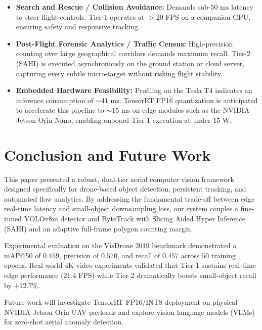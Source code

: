 \documentclass[conference]{IEEEtran}
\begin{document}
\begin{itemize}
    \item \textbf{Search and Rescue / Collision Avoidance:} Demands sub-$50\text{ ms}$ latency to steer flight controls. Tier-1 operates at $>20$ FPS on a companion GPU, ensuring safety and responsive tracking.
    \item \textbf{Post-Flight Forensic Analytics / Traffic Census:} High-precision counting over large geographical corridors demands maximum recall. Tier-2 (SAHI) is executed asynchronously on the ground station or cloud server, capturing every subtle micro-target without risking flight stability.
    \item \textbf{Embedded Hardware Feasibility:} Profiling on the Tesla T4 indicates an inference consumption of $\sim 41\text{ ms}$. TensorRT FP16 quantization is anticipated to accelerate this pipeline to $\sim 15\text{ ms}$ on edge modules such as the NVIDIA Jetson Orin Nano, enabling onboard Tier-1 execution at under $15\text{ W}$.
\end{itemize}

\section{Conclusion and Future Work}
This paper presented a robust, dual-tier aerial computer vision framework designed specifically for drone-based object detection, persistent tracking, and automated flow analytics. By addressing the fundamental trade-off between edge real-time latency and small-object downsampling loss, our system couples a fine-tuned YOLOv8m detector and ByteTrack with Slicing Aided Hyper Inference (SAHI) and an adaptive full-frame polygon counting margin. 

Experimental evaluation on the VisDrone 2019 benchmark demonstrated a mAP@50 of $0.459$, precision of $0.570$, and recall of $0.457$ across $50$ training epochs. Real-world 4K video experiments validated that Tier-1 sustains real-time edge performance ($21.4$ FPS) while Tier-2 dramatically boosts small-object recall by $+12.7\%$. 

Future work will investigate TensorRT FP16/INT8 deployment on physical NVIDIA Jetson Orin UAV payloads and explore vision-language models (VLMs) for zero-shot aerial anomaly detection.
\end{document}
